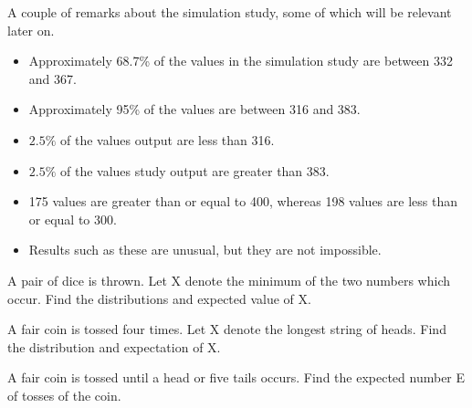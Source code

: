 \documentclass[12pt]{report}
\begin{document}
	
	A couple of remarks about the simulation study, some of which will be relevant later on.
	\begin{itemize}
		\item Approximately 68.7\% of the values in the simulation study are between 332 and 367.
		\item Approximately 95\% of the values are between 316 and 383.
		\item $2.5\%$ of the values output are less than 316.
		\item $2.5\%$ of the values study output are greater than 383.
		\item 175 values are greater than or equal to 400, whereas 198 values are less than or equal to 300.
		\item Results such as these are unusual, but they are not impossible.
	\end{itemize}
	
	A pair of dice is thrown. Let X denote the minimum of the two numbers which occur.
	Find the distributions and expected value of X.
	
	A fair coin is tossed four times.
	Let X denote the longest string of heads.
	Find the distribution and expectation of X.
	
	A fair coin is tossed until a head or five tails occurs.
	Find the expected number E of tosses of the coin.
	
\end{document}
